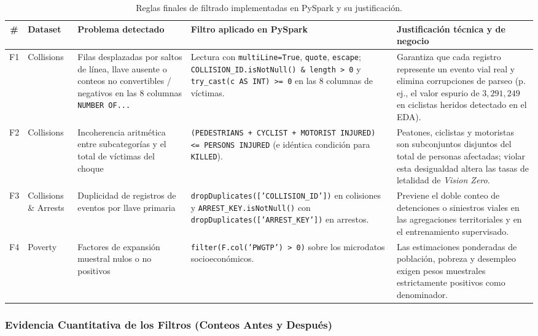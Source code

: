 \documentclass[11pt,a4paper]{article}
\begin{document}
\begin{table}[H]
\centering
\scriptsize
\renewcommand{\arraystretch}{1.25}
\caption{Reglas finales de filtrado implementadas en PySpark y su justificación.}
\label{tab:reglas_filtrado}
\begin{tabularx}{\linewidth}{c l >{\raggedright\arraybackslash}p{3.6cm} >{\raggedright\arraybackslash}p{4.2cm} X}
\toprule
\textbf{\#} & \textbf{Dataset} & \textbf{Problema detectado} & \textbf{Filtro aplicado en PySpark} & \textbf{Justificación técnica y de negocio} \\
\midrule
F1 & Collisions & Filas desplazadas por saltos de línea, llave ausente o conteos no convertibles / negativos en las 8 columnas \texttt{NUMBER OF...} & Lectura con \texttt{multiLine=True}, \texttt{quote}, \texttt{escape}; \texttt{COLLISION\_ID.isNotNull() \& length > 0} y \texttt{try\_cast(c AS INT) >= 0} en las 8 columnas de víctimas. & Garantiza que cada registro represente un evento vial real y elimina corrupciones de parseo (p.\,ej., el valor espurio de $3,291,249$ en ciclistas heridos detectado en el EDA). \\
F2 & Collisions & Incoherencia aritmética entre subcategorías y el total de víctimas del choque & \texttt{(PEDESTRIANS + CYCLIST + MOTORIST INJURED) <= PERSONS INJURED} (e idéntica condición para \texttt{KILLED}). & Peatones, ciclistas y motoristas son subconjuntos disjuntos del total de personas afectadas; violar esta desigualdad altera las tasas de letalidad de \textit{Vision Zero}. \\
F3 & Collisions \& Arrests & Duplicidad de registros de eventos por llave primaria & \texttt{dropDuplicates(['COLLISION\_ID'])} en colisiones y \texttt{ARREST\_KEY.isNotNull()} con \texttt{dropDuplicates(['ARREST\_KEY'])} en arrestos. & Previene el doble conteo de detenciones o siniestros viales en las agregaciones territoriales y en el entrenamiento supervisado. \\
F4 & Poverty & Factores de expansión muestral nulos o no positivos & \texttt{filter(F.col('PWGTP') > 0)} sobre los microdatos socioeconómicos. & Las estimaciones ponderadas de población, pobreza y desempleo exigen pesos muestrales estrictamente positivos como denominador. \\
\bottomrule
\end{tabularx}
\end{table}

\subsubsection{Evidencia Cuantitativa de los Filtros (Conteos Antes y Después)}
\end{document}
